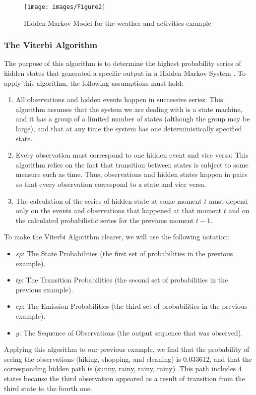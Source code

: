 \documentclass{acm_proc_article-sp}
\begin{document}
\begin{figure}
  \centering
  \texttt{[image: images/Figure2]}
  \caption{Hidden Markov Model for the weather and activities example}\label{Hidden-Markov-Model-for}
\end{figure}

\subsubsection{The Viterbi Algorithm}\label{The-Viterbi-Algorithm}
The purpose of this algorithm is to determine the highest probability series of hidden states that generated a specific output in a Hidden Markov System \cite{Viterbi1967}. To apply this algorithm, the following assumptions must hold:
\begin{enumerate}
    \item All observations and hidden events happen in successive series: This algorithm assumes that the system we are dealing with is a state machine, and it has a group of a limited number of states (although the group may be large), and that at any time the system has one deterministically specified state.
    \item Every observation must correspond to one hidden event and vice versa: This algorithm relies on the fact that transition between states is subject to some measure such as time. Thus, observations and hidden states happen in pairs so that every observation correspond to a state and vice versa.
    \item The calculation of the series of hidden state at some moment $t$ must depend only on the events and observations that happened at that moment $t$ and on the calculated probabilistic series for the previous moment $t-1$.
\end{enumerate}
To make the Viterbi Algorithm clearer, we will use the following notation:
\begin{itemize}
    \item $sp$: The State Probabilities (the first set of probabilities in the previous example).
    \item $tp$: The Transition Probabilities (the second set of probabilities in the previous example).
    \item $ep$: The Emission Probabilities (the third set of probabilities in the previous example).
    \item $y$: The Sequence of Observations (the output sequence that was observed).
\end{itemize}
Applying this algorithm to our previous example, we find that the probability of seeing the observations (hiking, shopping, and cleaning) is $0.033612$, and that the corresponding hidden path is (sunny, rainy, rainy, rainy). This path includes $4$ states because the third observation appeared as a result of transition from the third state to the fourth one.
\end{document}
